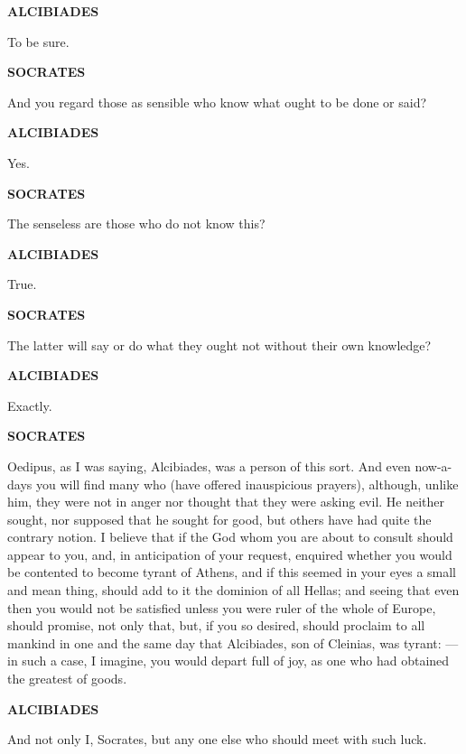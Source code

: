\documentclass[11pt,letter]{article}
\begin{document}
\par \textbf{ALCIBIADES}
\par   To be sure.

\par \textbf{SOCRATES}
\par   And you regard those as sensible who know what ought to be done or said?

\par \textbf{ALCIBIADES}
\par   Yes.

\par \textbf{SOCRATES}
\par   The senseless are those who do not know this?

\par \textbf{ALCIBIADES}
\par   True.

\par \textbf{SOCRATES}
\par   The latter will say or do what they ought not without their own knowledge?

\par \textbf{ALCIBIADES}
\par   Exactly.

\par \textbf{SOCRATES}
\par   Oedipus, as I was saying, Alcibiades, was a person of this sort. And even now-a-days you will find many who (have offered inauspicious prayers), although, unlike him, they were not in anger nor thought that they were asking evil. He neither sought, nor supposed that he sought for good, but others have had quite the contrary notion. I believe that if the God whom you are about to consult should appear to you, and, in anticipation of your request, enquired whether you would be contented to become tyrant of Athens, and if this seemed in your eyes a small and mean thing, should add to it the dominion of all Hellas; and seeing that even then you would not be satisfied unless you were ruler of the whole of Europe, should promise, not only that, but, if you so desired, should proclaim to all mankind in one and the same day that Alcibiades, son of Cleinias, was tyrant: —in such a case, I imagine, you would depart full of joy, as one who had obtained the greatest of goods.

\par \textbf{ALCIBIADES}
\par   And not only I, Socrates, but any one else who should meet with such luck.
\end{document}

